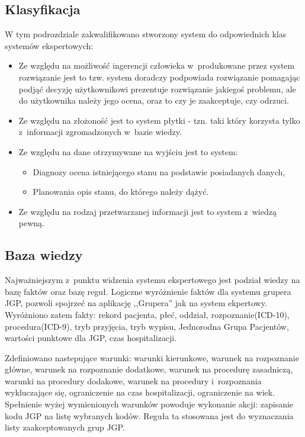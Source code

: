 \subsection{Klasyfikacja}
\label{sec:klasyfikacjaSystemuEkspertowego}
W tym podrozdziale zakwalifikowano stworzony system do odpowiednich klas systemów ekspertowych:
\begin{itemize}
 \item Ze względu na możliwość ingerencji człowieka w~produkowane przez system rozwiązanie jest to tzw. system doradczy \textendash{} podpowiada rozwiązanie pomagając podjąć decyzję użytkownikowi \textendash{} prezentuje rozwiązanie jakiegoś problemu, ale do użytkownika należy jego ocena, oraz to czy je zaakceptuje, czy odrzuci\cite{goluchowski_eskpertowe}.
 \item Ze względu na złożoność jest to system płytki - tzn. taki który korzysta tylko z~informacji zgromadzonych w~bazie wiedzy\cite{goluchowski_eskpertowe}.
 \item Ze względu na dane otrzymywane na wyjściu\cite{mulawka_ekspertowe} jest to system:
   \begin{itemize}
    \item Diagnozy \textendash{} ocena istniejącego stanu na podstawie posiadanych danych,
    \item Planowania \textendash{} opis stanu, do którego należy dążyć.
   \end{itemize}
 \item Ze względu na rodzaj przetwarzanej informacji jest to system z~wiedzą pewną\cite{mulawka_ekspertowe}.
\end{itemize}

\subsection{Baza wiedzy}
\label{sec:bazaWiedzy}
Najważniejszym z~punktu widzenia systemu ekspertowego jest podział wiedzy na bazę faktów oraz bazę reguł\cite{zielonogorski_ekspertowe}. Logiczne wyróżnienie faktów dla systemu grupera JGP, pozwoli spojrzeć na aplikację ,,Grupera'' jak na system ekpertowy. Wyróżniono zatem fakty: rekord pacjenta, płeć, oddział, rozpoznanie(ICD-10), procedura(ICD-9), tryb przyjęcia, tryb wypisu, Jednorodna Grupa Pacjentów, wartości punktowe dla JGP, czas hospitalizacji.

Zdefiniowano nastepujące warunki: warunki kierunkowe, warunek na rozpoznanie główne, warunek na rozpoznanie dodatkowe, warunek na procedurę zasadniczą, warunki na procedury dodakowe, warunek na procedury i~rozpoznania wykluczające się, ograniczenie na czas hospitalizacji, ograniczenie na wiek.
Spełnienie wyżej wymienionych warunków powoduje wykonanie akcji: zapisanie kodu JGP na listę wybranych kodów. Reguła ta stosowana jest do wyznaczania listy zaakceptowanych grup JGP.

